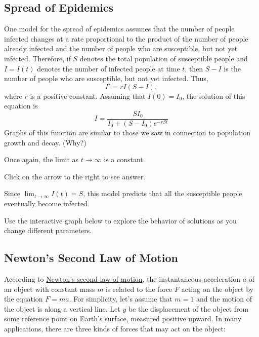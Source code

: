 \documentclass{ximera}
\begin{document}
\subsection*{Spread of Epidemics}
 
One model for the spread of epidemics assumes that the number of
people infected changes at a rate proportional to the product of the
number of people already infected and the number of people who are
susceptible, but not yet infected. Therefore, if $S$ denotes the
total population of susceptible people and $I=I(t)$ denotes the
number
of infected people at time $t$, then $S-I$ is the number of people
who are susceptible, but not yet infected. Thus,
$$
I'=rI(S-I),
$$
where $r$ is a positive constant. Assuming that $I(0)=I_0$,
the solution of this equation is
$$
I=\frac{SI_0}{I_0+(S-I_0)e^{-rSt}}
$$
 Graphs of this function are similar to those we saw in connection to population growth and decay.
(Why?)

\begin{solution}
Once again, the limit as $t \rightarrow \infty$ is a constant.
 \end{solution}
 
 Click on the arrow to the right to see answer.

Since $\lim_{t\to\infty}I(t)=S$, this model predicts that all the
susceptible people eventually become infected.

Use the interactive graph below to explore the behavior of solutions as you change different parameters.
 
\begin{center}  
\end{center}

 
\subsection*{Newton's Second Law of Motion}
 
According to
\href{https://en.wikipedia.org/wiki/Newton%27s_laws_of_motion#2nd}{Newton's second law of motion},  the
instantaneous acceleration
$a$ of an object with constant mass $m$ is related to the force $F$
acting on the object by the equation $F=ma$. For simplicity, let's
assume that $m=1$ and the motion of the object is along a vertical
line. Let $y$ be the displacement of the object from some reference
point on Earth's surface, measured positive upward. In many
applications, there are three kinds of forces that may act on the
object:
 
\end{document}
